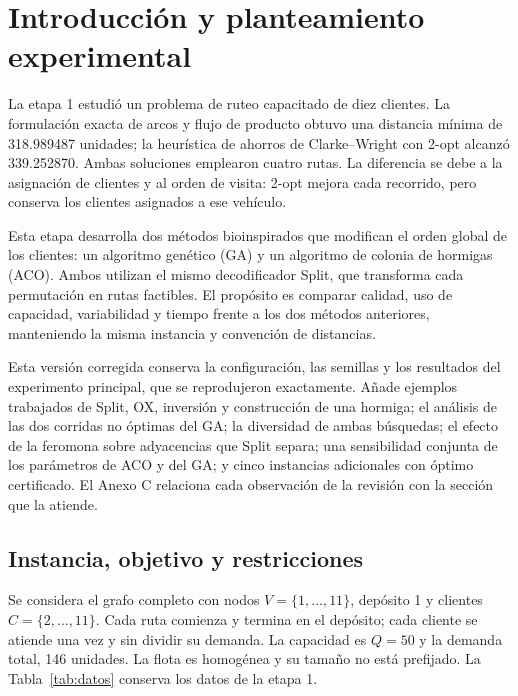 \documentclass[11pt,a4paper]{article}
\numberwithin{equation}{section}
\begin{document}

\setcounter{page}{2}

\section{Introducción y planteamiento experimental}

La etapa 1 estudió un problema de ruteo capacitado de diez clientes. La formulación exacta de arcos y flujo de producto obtuvo una distancia mínima de 318.989487 unidades; la heurística de ahorros de Clarke--Wright con 2-opt alcanzó 339.252870. Ambas soluciones emplearon cuatro rutas. La diferencia se debe a la asignación de clientes y al orden de visita: 2-opt mejora cada recorrido, pero conserva los clientes asignados a ese vehículo.

Esta etapa desarrolla dos métodos bioinspirados que modifican el orden global de los clientes: un algoritmo genético (GA) y un algoritmo de colonia de hormigas (ACO). Ambos utilizan el mismo decodificador Split, que transforma cada permutación en rutas factibles. El propósito es comparar calidad, uso de capacidad, variabilidad y tiempo frente a los dos métodos anteriores, manteniendo la misma instancia y convención de distancias.

Esta versión corregida conserva la configuración, las semillas y los resultados del experimento principal, que se reprodujeron exactamente. Añade ejemplos trabajados de Split, OX, inversión y construcción de una hormiga; el análisis de las dos corridas no óptimas del GA; la diversidad de ambas búsquedas; el efecto de la feromona sobre adyacencias que Split separa; una sensibilidad conjunta de los parámetros de ACO y del GA; y cinco instancias adicionales con óptimo certificado. El Anexo C relaciona cada observación de la revisión con la sección que la atiende.

\subsection{Instancia, objetivo y restricciones}

Se considera el grafo completo con nodos \(V=\{1,\dots,11\}\), depósito 1 y clientes \(C=\{2,\dots,11\}\). Cada ruta comienza y termina en el depósito; cada cliente se atiende una vez y sin dividir su demanda. La capacidad es \(Q=50\) y la demanda total, 146 unidades. La flota es homogénea y su tamaño no está prefijado. La Tabla~\ref{tab:datos} conserva los datos de la etapa 1.
\end{document}
